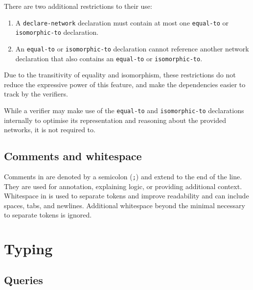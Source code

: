 There are two additional restrictions to their use:
\begin{enumerate}
\item A \texttt{declare-network} declaration must contain at most one \texttt{equal-to} or \texttt{isomorphic-to} declaration.
\item An \texttt{equal-to} or \texttt{isomorphic-to} declaration cannot reference another network declaration that also contains an \texttt{equal-to} or \texttt{isomorphic-to}. 
\end{enumerate}
Due to the transitivity of equality and isomorphism, these restrictions do not reduce the expressive power of this feature, and make the dependencies easier to track by the verifiers.

While a verifier may make use of the \texttt{equal-to} and \texttt{isomorphic-to} declarations internally to optimise its representation and reasoning about the provided networks, it is not required to.



\subsection{Comments and whitespace}

Comments in \vnnlib{} are denoted by a semicolon (\texttt{;}) and extend to the end of the line. They are used for annotation, explaining logic, or providing additional context. Whitespace in \vnnlib{} is used to separate tokens and improve readability and can include spaces, tabs, and newlines. Additional whitespace beyond the minimal necessary to separate tokens is ignored.


\section{Typing}
\label{sec:scoping_and_typing}

\subsection{Queries}
\label{sec:query-typing}

